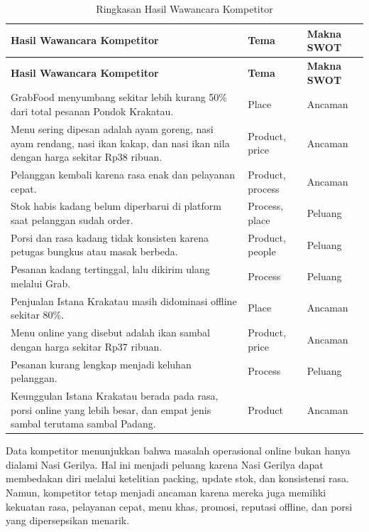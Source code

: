 \begingroup
    \scriptsize
    \begin{xltabular}{\textwidth}{|Y|Z{2.65cm}|Z{2.35cm}|}
        \caption{Ringkasan Hasil Wawancara Kompetitor}
        \label{tab:koding-kompetitor-bab4}\\
        \toprule
        \textbf{Hasil Wawancara Kompetitor} & \textbf{Tema} & \textbf{Makna SWOT} \\ \hline
        \midrule
        \endfirsthead
        \toprule
        \textbf{Hasil Wawancara Kompetitor} & \textbf{Tema} & \textbf{Makna SWOT} \\ \hline
        \midrule
        \endhead
        \endfoot
        \bottomrule
        \endlastfoot
        GrabFood menyumbang sekitar lebih kurang 50\% dari total pesanan Pondok Krakatau. & Place & Ancaman \\ \hline
        Menu sering dipesan adalah ayam goreng, nasi ayam rendang, nasi ikan kakap, dan nasi ikan nila dengan harga sekitar Rp38 ribuan. & Product, price & Ancaman \\ \hline
        Pelanggan kembali karena rasa enak dan pelayanan cepat. & Product, process & Ancaman \\ \hline
        Stok habis kadang belum diperbarui di platform saat pelanggan sudah order. & Process, place & Peluang \\ \hline
        Porsi dan rasa kadang tidak konsisten karena petugas bungkus atau masak berbeda. & Product, people & Peluang \\ \hline
        Pesanan kadang tertinggal, lalu dikirim ulang melalui Grab. & Process & Peluang \\ \hline
        Penjualan Istana Krakatau masih didominasi offline sekitar 80\%. & Place & Ancaman \\ \hline
        Menu online yang disebut adalah ikan sambal dengan harga sekitar Rp37 ribuan. & Product, price & Ancaman \\ \hline
        Pesanan kurang lengkap menjadi keluhan pelanggan. & Process & Peluang \\ \hline
        Keunggulan Istana Krakatau berada pada rasa, porsi online yang lebih besar, dan empat jenis sambal terutama sambal Padang. & Product & Ancaman \\ \hline
    \end{xltabular}
\endgroup

Data kompetitor menunjukkan bahwa masalah operasional online bukan hanya dialami Nasi Gerilya. Hal ini menjadi peluang karena Nasi Gerilya dapat membedakan diri melalui ketelitian packing, update stok, dan konsistensi rasa. Namun, kompetitor tetap menjadi ancaman karena mereka juga memiliki kekuatan rasa, pelayanan cepat, menu khas, promosi, reputasi offline, dan porsi yang dipersepsikan menarik.

